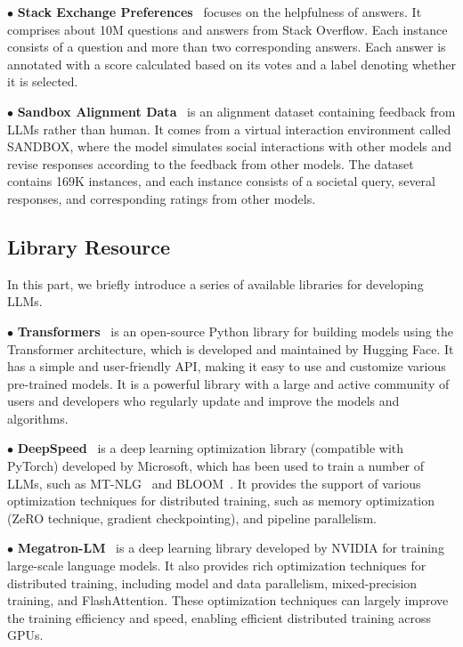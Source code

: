 {{{{ 
$\bullet$  {\textbf{Stack Exchange Preferences}}{~\cite{Lambert-2023-StackH4} focuses on the helpfulness of answers. It comprises about 10M questions and answers from Stack Overflow. Each instance consists of a question and more than two corresponding answers. Each answer is annotated with a score calculated based on its votes and a label denoting whether it is selected. 
 }


$\bullet$  {\textbf{Sandbox Alignment Data}}{~\cite{Liu-arxiv-2023-training} is an alignment dataset containing feedback from LLMs rather than human. It comes from a virtual interaction environment called SANDBOX, where the model simulates social interactions with other models and revise responses according to the feedback from other models. The dataset contains 169K instances, and each instance consists of a societal query, several responses, and corresponding ratings from other models.
 }

 }


\subsection{Library Resource}
\label{sec:library}

In this part, we briefly introduce a series of available libraries for developing LLMs. 

$\bullet$ \textbf{Transformers}~\cite{Wolf-EMNLP-2020-Transformers} is an open-source Python library for building models using the Transformer architecture,  which is developed and maintained by Hugging Face. 
It has a simple and user-friendly API, {making it easy to use and customize various pre-trained models.} It is a powerful library with a large and active community of users and developers who regularly update and improve the models and algorithms.

{$\bullet$ \textbf{DeepSpeed}~\cite{Rasley-KDD-2020-DeepSpeed} is a deep learning optimization library (compatible with PyTorch) developed by Microsoft, which has been used to train a number of LLMs, such as MT-NLG~\cite{Smith-CoRR-2022-Using} and BLOOM~\cite{Scao-arxiv-2022-BLOOM}.} It provides the support of various  optimization techniques for distributed training, such as memory optimization (ZeRO technique,  gradient checkpointing), and pipeline parallelism.

$\bullet$ \textbf{Megatron-LM}~\cite{Shoeybi-arXiv-2019-Megatron, Narayanan-ACM-2021-Efficient, Korthikanti-arxiv-2022-reducing} is a deep learning library developed by NVIDIA for training large-scale language models. It also provides rich optimization techniques for distributed training, {including  model and data parallelism, mixed-precision training, and FlashAttention.} These optimization techniques can largely improve the training efficiency and speed,  enabling efficient distributed training across GPUs.

}}}
